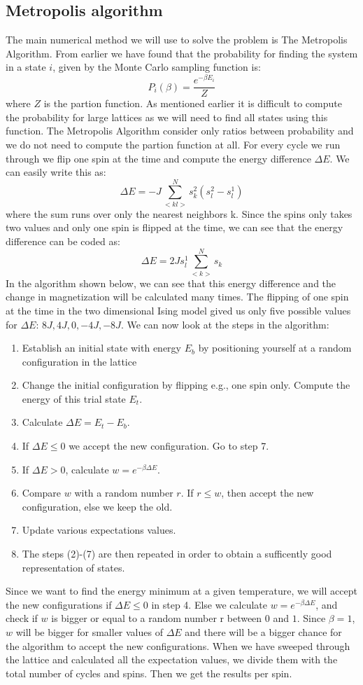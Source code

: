 \documentclass{article}
\begin{document}
\subsection*{Metropolis algorithm}
The main numerical method we will use to solve the problem is The Metropolis Algorithm. 
From earlier we have found that the probability for finding the system in a state $i$, given by the Monte Carlo sampling function is: 
$$P_i(\beta) = \frac{e^{-\beta E_i}}{Z} $$
where $Z$ is the partion function. As mentioned earlier it is difficult to compute the probability for large lattices as we will need to find all states using this function. 
The Metropolis Algorithm consider only ratios between probability and we do not need to compute the partion function at all. For every cycle we run through we flip one spin at the time and compute the energy difference $\Delta E$. We can easily write this as: 
$$\Delta E = - J\sum_{<kl>}^N s_k^2(s_l^2-s_l^1)$$
where the sum runs over only the nearest neighbors k. Since the spins only takes two values and only one spin is flipped at the time, we can see that the energy difference can be coded as: 
$$\Delta E = 2Js_l^1\sum _{<k>}^N s_k$$
In the algorithm shown below, we can see that this energy difference and the change in magnetization will be calculated many times. The flipping of one spin at the time in the two dimensional Ising model gived us only five possible values for $\Delta E$: $8J, 4J, 0, -4J, -8J$.\newline
We can now look at the steps in the algorithm: 
\begin{enumerate}
  \item Establish an initial state with energy $E_b$ by positioning yourself at a random configuration in the lattice
  \item Change the initial configuration by flipping e.g., one spin only. Compute the energy of this trial state $E_t$.
  \item Calculate $\Delta E = E_t - E_b$. 
  \item If $\Delta E \leq 0$ we accept the new configuration. Go to step 7.
  \item If $\Delta E > 0$, calculate $w = e^{-\beta \Delta E}$.
  \item Compare $w$ with a random number $r$. If $r \leq w$, then accept the new configuration, else we keep the old.
  \item Update various expectations values.
  \item The steps (2)-(7) are then repeated in order to obtain a sufficently good representation of states.
\end{enumerate}
Since we want to find the energy minimum at a given temperature, we will accept the new configurations if $\Delta E \leq 0$ in step 4. Else we calculate $w = e^{-\beta \Delta E}$, and check if $w$ is bigger or equal to a random number r between $0$ and $1$. Since $\beta = 1$, $w$ will be bigger for smaller values of $\Delta E$ and there will be a bigger chance for the algorithm to accept the new configurations. 
When we have sweeped through the lattice and calculated all the expectation values, we divide them with the total number of cycles and spins. Then we get the results per spin.  
\end{document}
